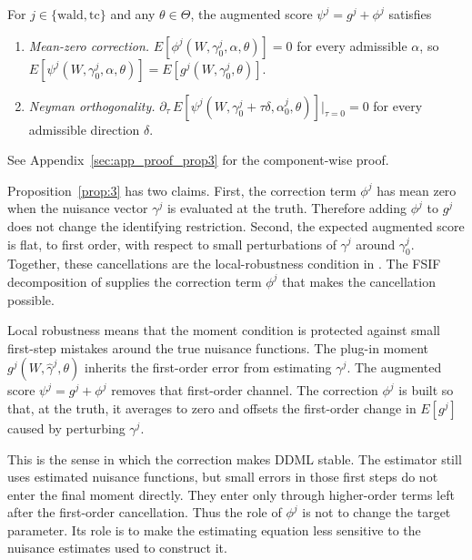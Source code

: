 \begin{proposition}\label{prop:3}
For $j \in \{\text{wald},\text{tc}\}$ and any $\theta \in \Theta$, the augmented score $\psi^j = g^j + \phi^j$ satisfies
\begin{enumerate}
\item \textit{Mean-zero correction.} $E[\phi^j(W,\gamma^j_0,\alpha,\theta)] = 0$ for every admissible $\alpha$, so $E[\psi^j(W,\gamma^j_0,\alpha,\theta)] = E[g^j(W,\gamma^j_0,\theta)]$.
\item \textit{Neyman orthogonality.} $\partial_\tau\, E[\psi^j(W,\gamma^j_0 + \tau\delta,\alpha^j_0,\theta)]|_{\tau=0} = 0$ for every admissible direction $\delta$.
\end{enumerate}
See Appendix~\ref{sec:app_proof_prop3} for the component-wise proof.
\end{proposition}

Proposition~\ref{prop:3} has two claims. First, the correction term $\phi^j$ has mean zero when the nuisance vector $\gamma^j$ is evaluated at the truth. Therefore adding $\phi^j$ to $g^j$ does not change the identifying restriction. Second, the expected augmented score is flat, to first order, with respect to small perturbations of $\gamma^j$ around $\gamma^j_0$. Together, these cancellations are the local-robustness condition in \citet[Equation~4.1]{chernozhukov2022locally}. The FSIF decomposition of \citet[Equation~2.6]{ichimura2022influence} supplies the correction term $\phi^j$ that makes the cancellation possible.

\begin{remark}\label{rmk:local_vs_double}
Local robustness means that the moment condition is protected against small first-step mistakes around the true nuisance functions. The plug-in moment $g^j(W,\hat\gamma^j,\theta)$ inherits the first-order error from estimating $\gamma^j$. The augmented score $\psi^j=g^j+\phi^j$ removes that first-order channel. The correction $\phi^j$ is built so that, at the truth, it averages to zero and offsets the first-order change in $E[g^j]$ caused by perturbing $\gamma^j$.

This is the sense in which the correction makes DDML stable. The estimator still uses estimated nuisance functions, but small errors in those first steps do not enter the final moment directly. They enter only through higher-order terms left after the first-order cancellation. Thus the role of $\phi^j$ is not to change the target parameter. Its role is to make the estimating equation less sensitive to the nuisance estimates used to construct it.
\end{remark}

